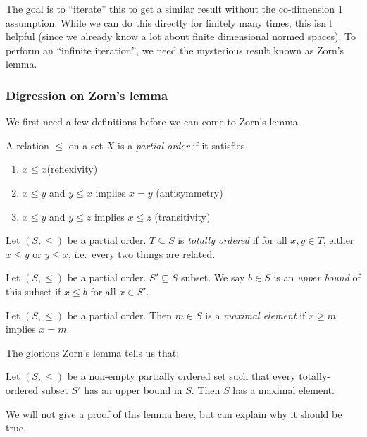 \documentclass[a4paper]{article}
\begin{document}
The goal is to ``iterate'' this to get a similar result without the co-dimension 1 assumption. While we can do this directly for finitely many times, this isn't helpful (since we already know a lot about finite dimensional normed spaces). To perform an ``infinite iteration'', we need the mysterious result known as Zorn's lemma.
\subsubsection*{Digression on Zorn's lemma}
We first need a few definitions before we can come to Zorn's lemma.
\begin{defi}
  A relation $\leq$ on a set $X$ is a \emph{partial order} if it satisfies
  \begin{enumerate}
    \item $x \leq x$\hfill (reflexivity)
    \item $x \leq y$ and $y \leq x$ implies $x = y$ \hfill (antisymmetry)
    \item $x \leq y$ and $y \leq z$ implies $x \leq z$ \hfill (transitivity)
  \end{enumerate}
\end{defi}

\begin{defi}
  Let $(S, \leq)$ be a partial order. $T\subseteq S$ is \emph{totally ordered} if for all $x, y\in T$, either $x \leq y$ or $y\leq x$, i.e.\ every two things are related.
\end{defi}

\begin{defi}
  Let $(S, \leq)$ be a partial order. $S'\subseteq S$ subset. We say $b\in S$ is an \emph{upper bound} of this subset if $x \leq b$ for all $x \in S'$.
\end{defi}

\begin{defi}
  Let $(S, \leq)$ be a partial order. Then $m\in S$ is a \emph{maximal element} if $x \geq m$ implies $x = m$.
\end{defi}

The glorious Zorn's lemma tells us that:
\begin{lemma}
  Let $(S, \leq)$ be a non-empty partially ordered set such that every totally-ordered subset $S'$ has an upper bound in $S$. Then $S$ has a maximal element.
\end{lemma}
We will not give a proof of this lemma here, but can explain why it should be true.
\end{document}
